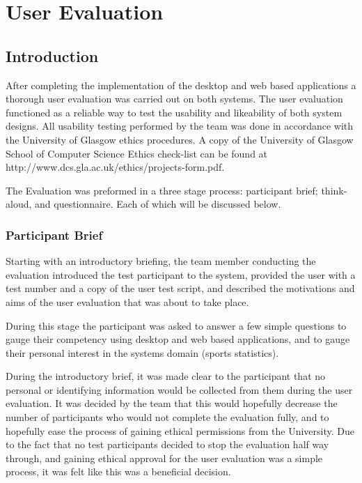 \section{User Evaluation}

\subsection{Introduction}

After completing the implementation of the desktop and web based applications a
thorough user evaluation was carried out on both systems. The user evaluation
functioned as a reliable way to test the usability and likeability of both
system designs. All usability testing performed by the team was done in
accordance with the University of Glasgow ethics procedures. A copy of the
University of Glasgow School of Computer Science Ethics check-list can be found
at http://www.dcs.gla.ac.uk/ethics/projects-form.pdf.

The Evaluation was preformed in a three stage process: participant brief;
think-aloud, and questionnaire. Each of which will be discussed below.

\subsubsection{Participant Brief}

Starting with an introductory briefing, the team member conducting the
evaluation introduced the test participant to the system, provided the user
with a test number and a copy of the user test script, and described the
motivations and aims of the user evaluation that was about to take place.

During this stage the participant was asked to answer a few simple questions to
gauge their competency using desktop and web based applications, and to gauge
their personal interest in the systems domain (sports statistics).

During the introductory brief, it was made clear to the participant that no
personal or identifying information would be collected from them during the
user evaluation. It was decided by the team that this would hopefully decrease
the number of participants who would not complete the evaluation fully, and to
hopefully ease the process of gaining ethical permissions from the University.
Due to the fact that no test participants decided to stop the evaluation half
way through, and gaining ethical approval for the user evaluation was a simple
process, it was felt like this was a beneficial decision.

